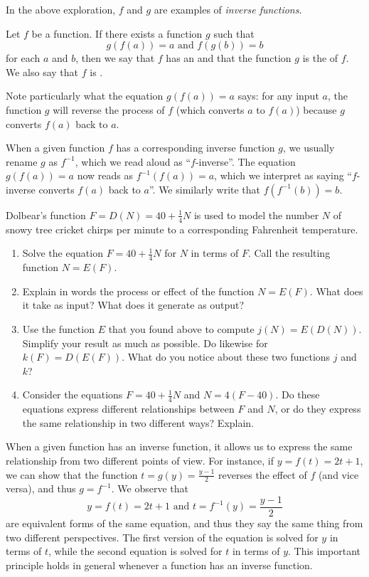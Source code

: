 \documentclass[nooutcomes]{ximera}
\begin{document}
In the above exploration, $f$ and $g$ are examples of \emph{inverse functions}. 

\begin{definition}
Let $f$ be a function. If there exists a function $g$ such that
$$
g(f(a)) = a \text{ and } f(g(b)) = b
$$
for each $a$ and $b$, then we say that $f$ has an  and that the function $g$ is the  of $f$. We also say that $f$ is . 
\end{definition}

Note particularly what the equation $g(f(a)) = a$ says:  for any input $a$, the function $g$ will reverse the process of $f$ (which converts $a$ to $f(a)$) because $g$ converts $f(a)$ back to $a$.

When a given function $f$ has a corresponding inverse function $g$, we usually rename $g$ as $f^{-1}$, which we read aloud as ``$f$-inverse''. The equation $g(f(a)) = a$ now reads as $f^{-1}(f(a)) = a$, which we interpret as saying ``$f$-inverse converts $f(a)$ back to $a$''. We similarly write that $f(f^{-1}(b)) = b$. 

\begin{exploration}
Dolbear's function $F = D(N) = 40 + \frac{1}{4}N$ is used to model the number $N$ of snowy tree cricket chirps per minute to a corresponding Fahrenheit temperature. 
\begin{enumerate}[label=\alph*.]
\item Solve the equation $F = 40 + \frac{1}{4}N$ for $N$ in terms of $F$. Call the resulting function $N = E(F)$. 
\item Explain in words the process or effect of the function $N = E(F)$. What does it take as input? What does it generate as output?
\item Use the function $E$ that you found above to compute $j(N) = E(D(N))$. Simplify your result as much as possible. Do likewise for $k(F) = D(E(F))$. What do you notice about these two functions $j$ and $k$?
\item Consider the equations $F = 40 + \frac{1}{4}N$ and $N = 4(F - 40)$. Do these equations express different relationships between $F$ and $N$, or do they express the same relationship in two different ways? Explain. 
\end{enumerate}
\end{exploration}

When a given function has an inverse function, it allows us to express the same relationship from two different points of view.  For instance, if $y = f(t) = 2t + 1$, we can show that the function $t = g(y) = \frac{y-1}{2}$ reverses the effect of $f$ (and vice versa), and thus $g = f^{-1}$.  We observe that 
$$
y = f(t) = 2t + 1 \text{ and } t = f^{-1}(y) = \frac{y-1}{2}
$$
are equivalent forms of the same equation, and thus they say the same thing from two different perspectives.  The first version of the equation is solved for $y$ in terms of $t$, while the second equation is solved for $t$ in terms of $y$.  This important principle holds in general whenever a function has an inverse function.
\end{document}
